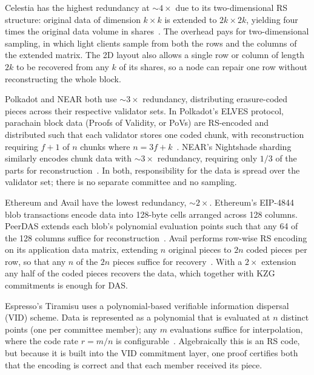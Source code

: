 Celestia has the highest redundancy at ${\sim}4\times$ due to its two-dimensional RS structure: original data of dimension $k \times k$ is extended to $2k \times 2k$, yielding four times the original data volume in shares~\cite{AlBassam_LazyLedger}.
The overhead pays for two-dimensional sampling, in which light clients sample from both the rows and the columns of the extended matrix.
The 2D layout also allows a single row or column of length $2k$ to be recovered from any $k$ of its shares, so a node can repair one row without reconstructing the whole block.

Polkadot and NEAR both use ${\sim}3\times$ redundancy, distributing erasure-coded pieces across their respective validator sets.
In Polkadot's ELVES protocol, parachain block data (Proofs of Validity, or PoVs) are RS-encoded and distributed such that each validator stores one coded chunk, with reconstruction requiring $f{+}1$ of $n$ chunks where $n = 3f + k$~\cite{Jeff_Burdges_ELVES, Overview_of_polkadot}.
NEAR's Nightshade sharding similarly encodes chunk data with ${\sim}3\times$ redundancy, requiring only $1/3$ of the parts for reconstruction~\cite{NEAR_Nightshade_Scaling_Blockchain}.
In both, responsibility for the data is spread over the validator set; there is no separate committee and no sampling.

Ethereum and Avail have the lowest redundancy, ${\sim}2\times$.
Ethereum's EIP-4844 blob transactions encode data into 128-byte cells arranged across 128 columns. PeerDAS extends each blob's polynomial evaluation points such that any 64 of the 128 columns suffice for reconstruction~\cite{EIP-7594}.
Avail performs row-wise RS encoding on its application data matrix, extending $n$ original pieces to $2n$ coded pieces per row, so that any $n$ of the $2n$ pieces suffice for recovery~\cite{Avail_The_DA_Blockchain}.
With a $2\times$ extension any half of the coded pieces recovers the data, which together with KZG commitments is enough for DAS.

Espresso's Tiramisu uses a polynomial-based verifiable information dispersal (VID) scheme.
Data is represented as a polynomial that is evaluated at $n$ distinct points (one per committee member); any $m$ evaluations suffice for interpolation, where the code rate $r = m/n$ is configurable~\cite{Espresso:Hotshot_and_Triamisu}.
Algebraically this is an RS code, but because it is built into the VID commitment layer, one proof certifies both that the encoding is correct and that each member received its piece.


